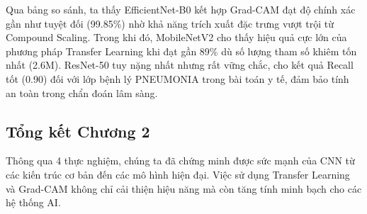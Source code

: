 Qua bảng so sánh, ta thấy EfficientNet-B0 kết hợp Grad-CAM đạt độ chính xác gần như tuyệt đối (99.85\%) nhờ khả năng trích xuất đặc trưng vượt trội từ Compound Scaling. Trong khi đó, MobileNetV2 cho thấy hiệu quả cực lớn của phương pháp Transfer Learning khi đạt gần 89\% dù số lượng tham số khiêm tốn nhất (2.6M). ResNet-50 tuy nặng nhất nhưng rất vững chắc, cho kết quả Recall tốt (0.90) đối với lớp bệnh lý PNEUMONIA trong bài toán y tế, đảm bảo tính an toàn trong chẩn đoán lâm sàng.

\subsection{Tổng kết Chương 2}
Thông qua 4 thực nghiệm, chúng ta đã chứng minh được sức mạnh của CNN từ các kiến trúc cơ bản đến các mô hình hiện đại. Việc sử dụng Transfer Learning và Grad-CAM không chỉ cải thiện hiệu năng mà còn tăng tính minh bạch cho các hệ thống AI.
